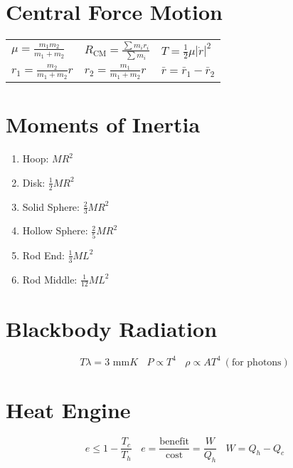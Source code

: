 \documentclass[10pt,letter]{article}
\begin{document}
\section{Central Force Motion} %
\label{sec:central_force_motion}
\begin{tabular}{l l l}
$\mu = \frac{m_1 m_2}{m_1 + m_2}$ & $R_{\textrm{CM}} = \frac{\sum m_i r_i}{\sum m_i}$ & $T = \frac{1}{2} \mu |\dot{r} | ^2$\\
$r_1 = \frac{m_2}{m_1 + m_2}r$ & $r_2 = \frac{m_1}{m_1 + m_2} r$ & $\bar{r} = \bar{r}_1 - \bar{r}_2$
\end{tabular}

\section{Moments of Inertia} %
\label{sec:moments_of_inertia}
\begin{enumerate}
    \item Hoop: $MR^2$
    \item Disk: $\frac{1}{2}MR^2$
    \item Solid Sphere: $\frac{2}{3}MR^2$
    \item Hollow Sphere: $\frac{2}{5} MR^2$
    \item Rod End: $ \frac{1}{3} ML^2$
    \item Rod Middle: $ \frac{1}{12} ML^2$
\end{enumerate}

\section{Blackbody Radiation} %
\label{sec:blackbody_radiation}
\begin{equation}
    T \lambda = 3 \textrm{ mm}K~~~~P \propto T^4~~~~ \rho \propto AT^4 ~(\textrm{for photons})
\end{equation}

\section{Heat Engine} %
\label{sec:heat_engine}
\begin{equation}
    e \leq 1 - \frac{T_c}{T_h}~~~~ e = \frac{\textrm{benefit}}{\textrm{cost}} = \frac{W}{Q_h}~~~~ W = Q_h - Q_c
\end{equation}
\end{document}
